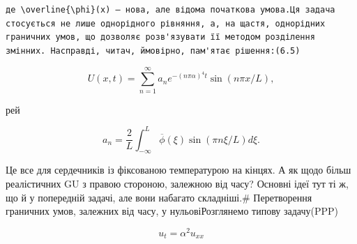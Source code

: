 \documentclass[
  ukrainian,
]{article}
\begin{document}
\begin{verbatim}
де \overline{\phi}(x) — нова, але відома початкова умова.Ця задача стосується не лише однорідного рівняння, а, на щастя, однорідних граничних умов, що дозволяє розв'язувати її методом розділення змінних. Насправді, читач, ймовірно, пам'ятає рішення:(6.5)
\end{verbatim}

\[
U(x, t) = \sum_{n=1}^{\infty} a_n e^{-(n\pi\alpha)^4 t} \sin(n\pi x/L),
\]

рей

\[
a_n = \frac{2}{L} \int_{-\infty}^{L} \overline{\phi}(\xi) \sin(\pi n\xi/L) d\xi.
\]

Це все для сердечників із фіксованою температурою на кінцях. А як щодо
більш реалістичних GU з правою стороною, залежною від часу? Основні ідеї
тут ті ж, що й у попередній задачі, але вони набагато складніші.\#
Перетворення граничних умов, залежних від часу, у нульовіРозглянемо
типову задачу(PPP)

\[
u_t = \alpha^2 u_{xx}
\]
\end{document}
